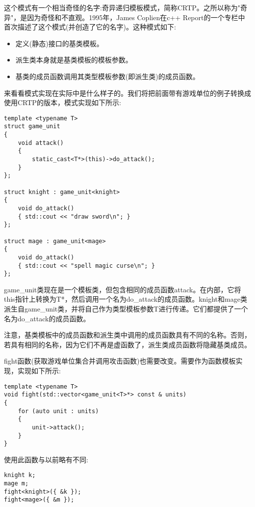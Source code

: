
这个模式有一个相当奇怪的名字:奇异递归模板模式，简称CRTP。之所以称为"奇异"，是因为奇怪和不直观。1995年，James Coplien在c++ Report的一个专栏中首次描述了这个模式(并创造了它的名字)。这种模式如下:

\begin{itemize}
\item
定义(静态)接口的基类模板。

\item
派生类本身就是基类模板的模板参数。

\item
基类的成员函数调用其类型模板参数(即派生类)的成员函数。
\end{itemize}

来看看模式实现在实际中是什么样子的。我们将把前面带有游戏单位的例子转换成使用CRTP的版本，模式实现如下所示:

\begin{lstlisting}[style=styleCXX]
template <typename T>
struct game_unit
{
	void attack()
	{
		static_cast<T*>(this)->do_attack();
	}
};

struct knight : game_unit<knight>
{
	void do_attack()
	{ std::cout << "draw sword\n"; }
};

struct mage : game_unit<mage>
{
	void do_attack()
	{ std::cout << "spell magic curse\n"; }
};
\end{lstlisting}

game\_unit类现在是一个模板类，但包含相同的成员函数attack。在内部，它将this指针上转换为T*，然后调用一个名为do\_attack的成员函数。knight和mage类派生自game\_unit类，并将自己作为类型模板参数T进行传递。它们都提供了一个名为do\_attack的成员函数。

注意，基类模板中的成员函数和派生类中调用的成员函数具有不同的名称。否则，若具有相同的名称，因为它们不再是虚函数了，派生类成员函数将隐藏基类成员。

fight函数(获取游戏单位集合并调用攻击函数)也需要改变。需要作为函数模板实现，实现如下所示:

\begin{lstlisting}[style=styleCXX]
template <typename T>
void fight(std::vector<game_unit<T>*> const & units)
{
	for (auto unit : units)
	{
		unit->attack();
	}
}
\end{lstlisting}

使用此函数与以前略有不同:

\begin{lstlisting}[style=styleCXX]
knight k;
mage m;
fight<knight>({ &k });
fight<mage>({ &m });
\end{lstlisting}

